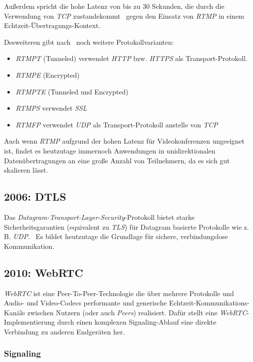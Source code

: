 \documentclass{article}
\begin{document}
\begin{onecolumn}
Außerdem spricht die hohe Latenz von bis zu 30 Sekunden, die durch die
Verwendung von \textit{TCP} zustandekommt~\cite{StreamingProtokolle} gegen den
Einsatz von \textit{RTMP} in einem Echtzeit-Übertragungs-Kontext.

Desweiteren gibt nach~\cite{RTMP} noch weitere Protokollvarianten:

\begin{itemize}
	\item \textit{RTMPT} (Tunneled) verwendet \textit{HTTP} bzw. \textit{HTTPS}
		als Transport-Protokoll.
	\item \textit{RTMPE} (Encrypted)
	\item \textit{RTMPTE} (Tunneled und Encrypted)
	\item \textit{RTMPS} verwendet \textit{SSL}
	\item \textit{RTMFP} verwendet \textit{UDP} als Transport-Protokoll
		anstelle von \textit{TCP}
\end{itemize}

Auch wenn \textit{RTMP} aufgrund der hohen Latenz für Videokonferenzen
ungeeignet ist, findet es heutzutage immernoch Anwendungen in
unidirektionalen Datenübertragungen an eine große Anzahl von Teilnehmern, da es
sich gut skalieren lässt.~\cite{RTMP}

\subsection{2006: DTLS}

Das \textit{Datagram-Transport-Layer-Security}-Protokoll bietet starke
Sicherheitsgarantien (equivalent zu \textit{TLS}) für Datagram basierte
Protokolle wie z. B. \textit{UDP}.~\cite{RFC4347} Es bildet heutzutage die
Grundlage für sichere, verbindungslose Kommunikation.


\subsection{2010: WebRTC}

\textit{WebRTC} ist eine Peer-To-Peer-Technologie die über mehrere Protokolle
und Audio- und Video-Codecs performante und generische
Echtzeit-Kommunikations-Kanäle zwischen Nutzern (oder auch \textit{Peers})
realisiert. Dafür stellt eine \textit{WebRTC}-Implementierung durch einen
komplexen Signaling-Ablauf eine direkte Verbindung zu anderen Endgeräten
her.~\cite{MDNSignaling}

\subsubsection{Signaling}


\end{onecolumn}
\end{document}
